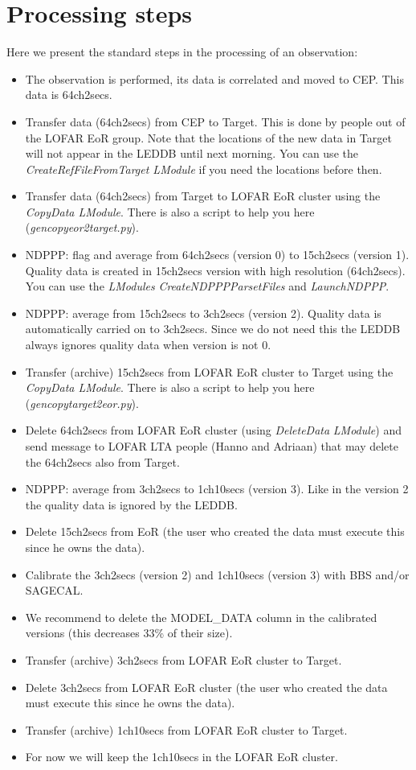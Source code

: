 \documentclass[a4paper,11pt]{article}
\begin{document}
\section {Processing steps}  
\label{sec:proc}
Here we present the standard steps in the processing of an observation:
\begin{itemize}
\item The observation is performed, its data is correlated and moved to CEP. This data is 64ch2secs.
\item Transfer data (64ch2secs) from CEP to Target. This is done by people out of the LOFAR EoR group. Note that the locations of the new data in Target will not appear in the LEDDB until next morning. You can use the \textit{CreateRefFileFromTarget LModule} if you need the locations before then.
\item Transfer data (64ch2secs) from Target to LOFAR EoR cluster using the \textit{CopyData LModule}. There is also a script to help you here (\textit{gencopyeor2target.py}).
\item NDPPP: flag and average from 64ch2secs (version 0) to 15ch2secs (version 1). Quality data is created in 15ch2secs version with high resolution (64ch2secs). You can use the \textit{LModules} \textit{CreateNDPPPParsetFiles} and \textit{LaunchNDPPP}.
\item NDPPP: average from 15ch2secs to 3ch2secs (version 2). Quality data is automatically carried on to 3ch2secs. Since we do not need this the LEDDB always ignores quality data when version is not 0.
\item Transfer (archive) 15ch2secs from LOFAR EoR cluster to Target using the \textit{CopyData LModule}. There is also a script to help you here (\textit{gencopytarget2eor.py}).
\item Delete 64ch2secs from LOFAR EoR cluster (using \textit{DeleteData} \textit{LModule}) and send message to LOFAR LTA people (Hanno and Adriaan) that may delete the 64ch2secs also from Target.
\item NDPPP: average from 3ch2secs to 1ch10secs (version 3). Like in the version 2 the quality data is ignored by the LEDDB.
\item Delete 15ch2secs from EoR (the user who created the data must execute this since he owns the data).
\item Calibrate the 3ch2secs (version 2) and 1ch10secs (version 3) with BBS and/or SAGECAL.
\item We recommend to delete the MODEL\_DATA column in the calibrated versions (this decreases 33\% of their size).
\item Transfer (archive) 3ch2secs from LOFAR EoR cluster to Target.
\item Delete 3ch2secs from LOFAR EoR cluster (the user who created the data must execute this since he owns the data).
\item Transfer (archive) 1ch10secs from LOFAR EoR cluster to Target.
\item For now we will keep the 1ch10secs in the LOFAR EoR cluster.
\end{itemize}
\end{document}
